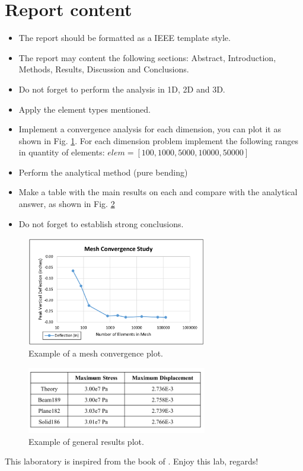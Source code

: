 \documentclass[letterpaper,pdftex]{article}
\begin{document}
\section{Report content}
\begin{itemize}
\item The report should be formatted as a IEEE template style.
\item The report may content the following sections: Abstract, Introduction, Methods, Results, Discussion and Conclusions.
\item Do not forget to perform the analysis in 1D, 2D and 3D. 
\item Apply the element types mentioned.
\item Implement a convergence analysis for each dimension, you can plot it as shown in Fig. \ref{fig:convergence}. For each dimension problem implement the following ranges in quantity of elements: $elem=[100,1000,5000,10000,50000]$
\item Perform the analytical method (pure bending)
\item Make a table with the main results on each and compare with the analytical answer, as shown in Fig. \ref{fig:tableresults}
\item Do not forget to establish strong conclusions. 
\end{itemize}

\begin{figure}[h]
   \centering
   \includegraphics[width=0.7\textwidth]{Mesh-Convergence}
   \caption{Example of a mesh convergence plot.}
   \label{fig:convergence}
\end{figure}

\begin{figure}[h]
   \centering
   \includegraphics[width=0.7\textwidth]{tableresults}
   \caption{Example of general results plot.}
   \label{fig:tableresults}
\end{figure}

This laboratory is inspired from the book of \cite{Thompson2017}. Enjoy this lab, regards!





\end{document}
